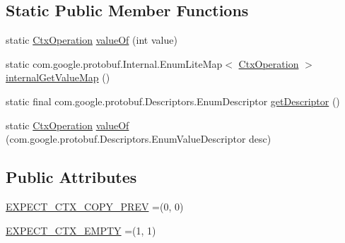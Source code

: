 \subsection*{Static Public Member Functions}
\begin{DoxyCompactItemize}
\item 
static \mbox{\hyperlink{enumcom_1_1mysql_1_1cj_1_1x_1_1protobuf_1_1_mysqlx_expect_1_1_open_1_1_ctx_operation}{Ctx\+Operation}} \mbox{\hyperlink{enumcom_1_1mysql_1_1cj_1_1x_1_1protobuf_1_1_mysqlx_expect_1_1_open_1_1_ctx_operation_a26176efbed837d025e7d890e38e655fc}{value\+Of}} (int value)
\item 
static com.\+google.\+protobuf.\+Internal.\+Enum\+Lite\+Map$<$ \mbox{\hyperlink{enumcom_1_1mysql_1_1cj_1_1x_1_1protobuf_1_1_mysqlx_expect_1_1_open_1_1_ctx_operation}{Ctx\+Operation}} $>$ \mbox{\hyperlink{enumcom_1_1mysql_1_1cj_1_1x_1_1protobuf_1_1_mysqlx_expect_1_1_open_1_1_ctx_operation_a59565389ad191c2e946ca9eb5f2d59cb}{internal\+Get\+Value\+Map}} ()
\item 
static final com.\+google.\+protobuf.\+Descriptors.\+Enum\+Descriptor \mbox{\hyperlink{enumcom_1_1mysql_1_1cj_1_1x_1_1protobuf_1_1_mysqlx_expect_1_1_open_1_1_ctx_operation_a59f8f5e8a2f3c5fe5b6ca5ca43e5faf7}{get\+Descriptor}} ()
\item 
static \mbox{\hyperlink{enumcom_1_1mysql_1_1cj_1_1x_1_1protobuf_1_1_mysqlx_expect_1_1_open_1_1_ctx_operation}{Ctx\+Operation}} \mbox{\hyperlink{enumcom_1_1mysql_1_1cj_1_1x_1_1protobuf_1_1_mysqlx_expect_1_1_open_1_1_ctx_operation_a560a5034845ccf860f35ff5e51baeffa}{value\+Of}} (com.\+google.\+protobuf.\+Descriptors.\+Enum\+Value\+Descriptor desc)
\end{DoxyCompactItemize}
\subsection*{Public Attributes}
\begin{DoxyCompactItemize}
\item 
\mbox{\hyperlink{enumcom_1_1mysql_1_1cj_1_1x_1_1protobuf_1_1_mysqlx_expect_1_1_open_1_1_ctx_operation_a7f58b438fc85b51f5026af47b95a9530}{E\+X\+P\+E\+C\+T\+\_\+\+C\+T\+X\+\_\+\+C\+O\+P\+Y\+\_\+\+P\+R\+EV}} =(0, 0)
\item 
\mbox{\hyperlink{enumcom_1_1mysql_1_1cj_1_1x_1_1protobuf_1_1_mysqlx_expect_1_1_open_1_1_ctx_operation_a2a53992a0efe3b4d491b01a93cb51ea4}{E\+X\+P\+E\+C\+T\+\_\+\+C\+T\+X\+\_\+\+E\+M\+P\+TY}} =(1, 1)
\end{DoxyCompactItemize}
